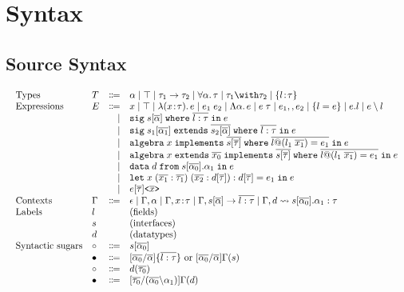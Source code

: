 \documentclass[a4paper]{article}
\begin{document}
\section{Syntax}

\subsection{Source Syntax}

\begin{displaymath}
    \begin{array}{l}
      \begin{array}{llrl}
        \text{Types}
        & T & \Coloneqq & \alpha \mid \top \mid \tau_1 \to \tau_2 \mid \for \alpha \tau \mid \tau_1 \andop \tau_2 \mid \recty l \tau \\
        \text{Expressions}
        & E & \Coloneqq & x \mid \top \mid \lam x \tau e \mid \app {e_1} {e_2} \mid \blam \alpha e \mid \tapp e \tau \mid e_1 \mergeop e_2 \mid \reccon l e \mid e.l \mid e \restrictop l \\
        &   & \mid & \sig s \alpha l \tau e \\
        &   & \mid & \sigext {s_1} {\alpha_1} {s_2} \alpha l \tau e \\
        &   & \mid & \alg x s \tau l {l_1} {x_1} {e_1} e \\
        &   & \mid & \algext x {x_0} s \tau l {l_1} {x_1} {e_1} e \\
        &   & \mid & \data d s {\alpha_0} {\alpha_1} e \\
        &   & \mid & \letexpr {x \; (\overline{x_1} : \overline{\tau_1}) \; (\overline{x_2} : d[\overline{\tau}]) : d[\overline{\tau}]} {e_1} e \\
        &   & \mid & e[\overline{\tau}]\texttt{<}\overline{x}\texttt{>} \\
        \text{Contexts} & \Gamma & \Coloneqq & \epsilon \mid \Gamma, \alpha \mid \Gamma, x \hast \tau \mid \Gamma, s {[} \overline{\alpha} {]}\to\overline{l:\tau} \mid \Gamma, d \rightsquigarrow s[\overline{\alpha_0}].\alpha_1 : \tau \\
        \text{Labels} & l &  & \text{(fields)} \\
        & s &  & \text{(interfaces)} \\
        & d &  & \text{(datatypes)}\\
        \text{Syntactic sugars} & \circ & \Coloneqq & s[\overline{\alpha_0}] \\
        & \bullet & \Coloneqq & [\overline{\alpha_0}/\overline{\alpha}]\{\overline{l:\tau}\} \text{ or } [\overline{\alpha_0}/\overline{\alpha}]\Gamma(s) \\
        & \circ & \Coloneqq & d(\overline{\tau_0}) \\
        & \bullet & \Coloneqq & [\overline{\tau_0}/(\overline{\alpha_0}\backslash\alpha_1)]\Gamma(d)
      \end{array}
    \end{array}
\end{displaymath}
\end{document}
